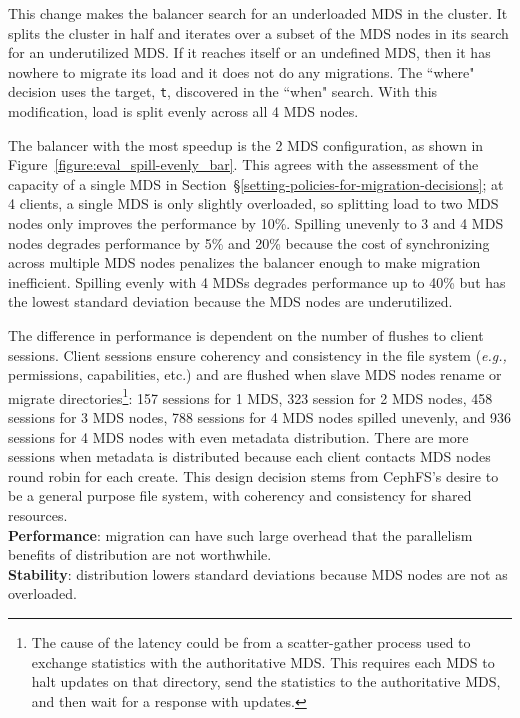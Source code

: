 This change makes the balancer search for an underloaded MDS in the cluster. It splits the cluster in half and iterates over a subset of the MDS nodes in its search for an underutilized MDS. If it reaches itself or an undefined MDS, then it has nowhere to migrate its load and it does not do any migrations. The ``where" decision uses the target, \texttt{t}, discovered in the ``when" search. With this modification, load is split evenly across all 4 MDS nodes.

The balancer with the most speedup is the 2 MDS configuration, as shown in Figure~\ref{figure:eval_spill-evenly_bar}. This agrees with the assessment of the capacity of a single MDS in Section~\S\ref{setting-policies-for-migration-decisions}; at 4 clients, a single MDS is only slightly overloaded, so splitting load to two MDS nodes only improves the performance by 10\%. Spilling unevenly to 3 and 4 MDS nodes degrades performance by 5\% and 20\% because the cost of synchronizing across multiple MDS nodes penalizes the balancer enough to make migration inefficient. Spilling evenly with 4 MDSs degrades performance up to 40\%  but has the lowest standard deviation because the MDS nodes are underutilized.

The difference in performance is dependent on the number of flushes to client sessions. Client sessions ensure coherency and consistency in the file system ({\it e.g.,} permissions, capabilities, etc.) and are flushed when slave MDS nodes rename or migrate directories\footnote{The cause of the latency could be from a scatter-gather process used to exchange statistics with the authoritative MDS. This requires each MDS to halt updates on that directory, send the statistics to the authoritative MDS, and then wait for a response with updates.}: 157 sessions for 1 MDS, 323 session for 2 MDS nodes, 458 sessions for 3 MDS nodes, 788 sessions for 4 MDS nodes spilled unevenly, and 936 sessions for 4 MDS nodes with even metadata distribution. There are more sessions when metadata is distributed because each client contacts MDS nodes round robin for each create. This design decision stems from CephFS's desire to be a general purpose file system, with coherency and consistency for shared resources.\\

\noindent\textbf{Performance}: migration can have such large overhead that the parallelism benefits of distribution are not worthwhile.\\
\noindent\textbf{Stability}: distribution lowers standard deviations because MDS nodes are not as overloaded.

